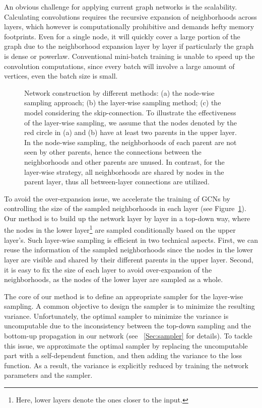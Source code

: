 \documentclass{article}
\begin{document}
An obvious challenge for applying current graph networks is the scalability. Calculating convolutions requires the recursive expansion of neighborhoods across layers, which however is computationally prohibitive and demands hefty memory footprints.
Even for a single node, it will quickly cover a large portion of the graph due to the neighborhood expansion layer by layer if particularly the graph is dense or powerlaw. Conventional mini-batch training is unable to  speed up the convolution computations, since every batch will involve a large amount of vertices, even the batch size is small.


\begin{figure}[!t]
\begin{center}
\caption{Network construction by different methods: (a) the node-wise sampling approach; (b) the layer-wise sampling method; (c) the model considering the skip-connection. To illustrate the effectiveness of the layer-wise sampling, we assume that the nodes denoted by the red circle in (a) and (b) have at least two parents in the upper layer. In the node-wise sampling, the neighborhoods of each parent are not seen by other parents, hence the connections between the neighborhoods and other parents are unused. In contrast, for the layer-wise strategy, all neighborhoods are shared by nodes in the parent layer, thus all between-layer connections are utilized. }
\label{Fig:sampling}
\end{center}
\end{figure}

To avoid the over-expansion issue, we accelerate the training of GCNs by controlling the size of the sampled neighborhoods in each layer (see Figure~\ref{Fig:sampling}). Our method is to build up the network layer by layer in a top-down way, where the nodes in the lower layer\footnote{Here, lower layers denote the ones closer to the input.} are sampled conditionally based on the upper layer's. Such layer-wise sampling is efficient in two technical aspects. First, we can reuse the information of the sampled neighborhoods since the nodes in the lower layer are visible and shared by their different parents in the upper layer. Second, it is easy to fix the size of each layer to avoid over-expansion of the neighborhoods, as the nodes of the lower layer are sampled as a whole.

The core of our method is to define an appropriate sampler for the layer-wise sampling. A common objective to design the sampler is to minimize the resulting variance. Unfortunately, the optimal sampler to minimize the variance is uncomputable due to the inconsistency between the top-down sampling and the bottom-up propagation in our network (see \textsection~\ref{Sec:sampler} for details). To tackle this issue, we approximate the optimal sampler by replacing the uncomputable part with a self-dependent function, and then adding the variance to the loss function. As a result, the variance is explicitly reduced by training the network parameters and the sampler.
\end{document}
